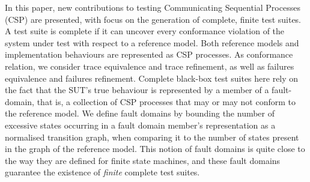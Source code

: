 In this paper, new contributions to testing Communicating Sequential
Processes (CSP) are presented, with focus on the generation of complete,
finite test suites. A test suite is complete if it can uncover every
conformance violation of the system under test with respect to a reference
model. Both reference models and implementation behaviours are represented as
CSP processes. As conformance relation, we consider trace equivalence and
trace refinement, as well as failures equivalence and failures refinement.
Complete black-box test suites here rely on the fact that the SUT's true
behaviour is represented by a member of a fault-domain, that is, a collection
of CSP processes that may or may not conform to the reference model. We
define fault domains by bounding the number of excessive states occurring in
a fault domain member's representation as a normalised transition graph, when
comparing it to the number of states present in the graph of the reference
model. This notion of fault domains is quite close to the way they are
defined for finite state machines, and these fault domains guarantee the
existence of {\it finite} complete test suites.
